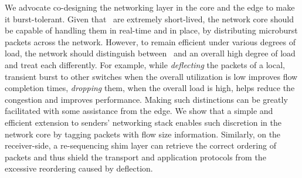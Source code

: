 We advocate co-designing the networking layer in the core and the edge to make it burst-tolerant. Given that \bursts \ are extremely short-lived, the network core should be capable of handling them in real-time and in place, \eg by distributing microburst packets across the network. However, to remain efficient under various degrees of load, the network should distinguish between \bursts \ and an overall high degree of load and treat each differently. For example, while \emph{deflecting} the packets of a local, transient burst to other switches when the overall utilization is low improves flow completion times, \emph{dropping} them, when the overall load is high, helps reduce the congestion and improves performance. Making such distinctions can be greatly facilitated with some assistance from the edge. We show that a simple and efficient extension to senders' networking stack enables such discretion in the network core by tagging packets with flow size information. Similarly, on the receiver-side, a re-sequencing shim layer can retrieve the correct ordering of packets and thus shield the transport and application protocols from the excessive reordering caused by deflection.

